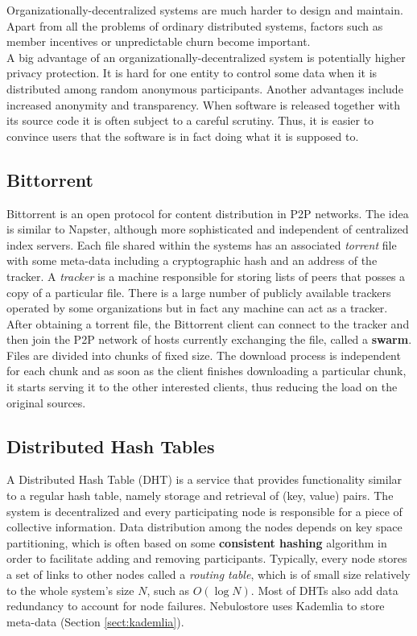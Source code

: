 \documentclass{pracamgren}
\newcounter{collective_ctr} \numberwithin{collective_ctr}{chapter}
\begin{document}
Organizationally-decentralized systems are much harder to design and maintain. Apart from all the problems of ordinary distributed systems, factors such as member incentives or unpredictable churn become important.\\

A big advantage of an organizationally-decentralized system is potentially higher privacy protection. It is hard for one entity to control some data when it is distributed among random anonymous participants.
Another advantages include increased anonymity and transparency. When software is released together with its source code it is often subject to a careful scrutiny. Thus, it is easier to convince users that the software is in fact doing what it is supposed to.\\

\subsection{Bittorrent}

Bittorrent \cite{bittorrent} is an open protocol for content distribution in P2P networks. The idea is similar to Napster, although more sophisticated and independent of centralized index servers. Each file shared within the systems has an associated {\it torrent} file with some meta-data including a cryptographic hash and an address of the tracker. A {\it tracker} is a machine responsible for storing lists of peers that posses a copy of a particular file. There is a large number of publicly available trackers operated by some organizations but in fact any machine can act as a tracker.\\

After obtaining a torrent file, the Bittorrent client can connect to the tracker and then join the P2P network of hosts currently exchanging the file, called a {\bf swarm}. Files are divided into chunks of fixed size. The download process is independent for each chunk and as soon as the client finishes downloading a particular chunk, it starts serving it to the other interested clients, thus reducing the load on the original sources.\\

\subsection{Distributed Hash Tables}

A Distributed Hash Table (DHT) is a service that provides functionality similar to a regular hash table, namely storage and retrieval of (key, value) pairs. The system is decentralized and every participating node is responsible for a piece of collective information. Data distribution among the nodes depends on key space partitioning, which is often based on some {\bf consistent hashing} algorithm in order to facilitate adding and removing participants. Typically, every node stores a set of links to other nodes called a {\it routing table}, which is of small size relatively to the whole system's size $N$, such as $O(\log N)$. Most of DHTs also add data redundancy to account for node failures. Nebulostore uses Kademlia \cite{kademlia} to store meta-data (Section \ref{sect:kademlia}).\\
\end{document}
